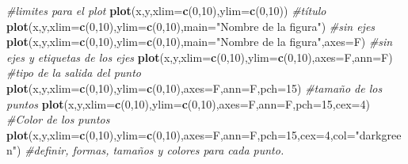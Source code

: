 \documentclass[
]{book}
\newenvironment{Shaded}{\begin{snugshade}}{\end{snugshade}}
\newcommand{\CommentTok}[1]{\textcolor[rgb]{0.56,0.35,0.01}{\textit{#1}}}
\newcommand{\DataTypeTok}[1]{\textcolor[rgb]{0.13,0.29,0.53}{#1}}
\newcommand{\DecValTok}[1]{\textcolor[rgb]{0.00,0.00,0.81}{#1}}
\newcommand{\KeywordTok}[1]{\textcolor[rgb]{0.13,0.29,0.53}{\textbf{#1}}}
\newcommand{\NormalTok}[1]{#1}
\newcommand{\StringTok}[1]{\textcolor[rgb]{0.31,0.60,0.02}{#1}}
\begin{document}
\begin{Shaded}
\begin{Highlighting}[]
\CommentTok{#limites para el plot}
\KeywordTok{plot}\NormalTok{(x,y,}\DataTypeTok{xlim=}\KeywordTok{c}\NormalTok{(}\DecValTok{0}\NormalTok{,}\DecValTok{10}\NormalTok{),}\DataTypeTok{ylim=}\KeywordTok{c}\NormalTok{(}\DecValTok{0}\NormalTok{,}\DecValTok{10}\NormalTok{))}
\CommentTok{#título}
\KeywordTok{plot}\NormalTok{(x,y,}\DataTypeTok{xlim=}\KeywordTok{c}\NormalTok{(}\DecValTok{0}\NormalTok{,}\DecValTok{10}\NormalTok{),}\DataTypeTok{ylim=}\KeywordTok{c}\NormalTok{(}\DecValTok{0}\NormalTok{,}\DecValTok{10}\NormalTok{),}\DataTypeTok{main=}\StringTok{"Nombre de la figura"}\NormalTok{)}
\CommentTok{#sin ejes}
\KeywordTok{plot}\NormalTok{(x,y,}\DataTypeTok{xlim=}\KeywordTok{c}\NormalTok{(}\DecValTok{0}\NormalTok{,}\DecValTok{10}\NormalTok{),}\DataTypeTok{ylim=}\KeywordTok{c}\NormalTok{(}\DecValTok{0}\NormalTok{,}\DecValTok{10}\NormalTok{),}\DataTypeTok{main=}\StringTok{"Nombre de la figura"}\NormalTok{,}\DataTypeTok{axes=}\NormalTok{F)}
\CommentTok{#sin ejes y etiquetas de los ejes}
\KeywordTok{plot}\NormalTok{(x,y,}\DataTypeTok{xlim=}\KeywordTok{c}\NormalTok{(}\DecValTok{0}\NormalTok{,}\DecValTok{10}\NormalTok{),}\DataTypeTok{ylim=}\KeywordTok{c}\NormalTok{(}\DecValTok{0}\NormalTok{,}\DecValTok{10}\NormalTok{),}\DataTypeTok{axes=}\NormalTok{F,}\DataTypeTok{ann=}\NormalTok{F)}
\CommentTok{#tipo de la salida del punto}
\KeywordTok{plot}\NormalTok{(x,y,}\DataTypeTok{xlim=}\KeywordTok{c}\NormalTok{(}\DecValTok{0}\NormalTok{,}\DecValTok{10}\NormalTok{),}\DataTypeTok{ylim=}\KeywordTok{c}\NormalTok{(}\DecValTok{0}\NormalTok{,}\DecValTok{10}\NormalTok{),}\DataTypeTok{axes=}\NormalTok{F,}\DataTypeTok{ann=}\NormalTok{F,}\DataTypeTok{pch=}\DecValTok{15}\NormalTok{)}
\CommentTok{#tamaño de los puntos}
\KeywordTok{plot}\NormalTok{(x,y,}\DataTypeTok{xlim=}\KeywordTok{c}\NormalTok{(}\DecValTok{0}\NormalTok{,}\DecValTok{10}\NormalTok{),}\DataTypeTok{ylim=}\KeywordTok{c}\NormalTok{(}\DecValTok{0}\NormalTok{,}\DecValTok{10}\NormalTok{),}\DataTypeTok{axes=}\NormalTok{F,}\DataTypeTok{ann=}\NormalTok{F,}\DataTypeTok{pch=}\DecValTok{15}\NormalTok{,}\DataTypeTok{cex=}\DecValTok{4}\NormalTok{)}
\CommentTok{#Color de los puntos}
\KeywordTok{plot}\NormalTok{(x,y,}\DataTypeTok{xlim=}\KeywordTok{c}\NormalTok{(}\DecValTok{0}\NormalTok{,}\DecValTok{10}\NormalTok{),}\DataTypeTok{ylim=}\KeywordTok{c}\NormalTok{(}\DecValTok{0}\NormalTok{,}\DecValTok{10}\NormalTok{),}\DataTypeTok{axes=}\NormalTok{F,}\DataTypeTok{ann=}\NormalTok{F,}\DataTypeTok{pch=}\DecValTok{15}\NormalTok{,}\DataTypeTok{cex=}\DecValTok{4}\NormalTok{,}\DataTypeTok{col=}\StringTok{"darkgreen"}\NormalTok{)}
\CommentTok{#definir, formas, tamaños y colores para cada punto.}

\end{Highlighting}
\end{Shaded}
\end{document}
